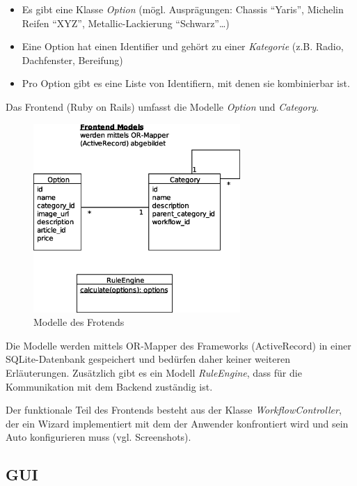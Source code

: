 \documentclass[a4paper,10pt]{article}
\begin{document}
\begin{itemize}
 \item Es gibt eine Klasse \emph{Option} (mögl. Ausprägungen: Chassis "`Yaris"', Michelin Reifen "`XYZ"', Metallic-Lackierung "`Schwarz"'\ldots)
 \item Eine Option hat einen Identifier und gehört zu einer \emph{Kategorie} (z.B. Radio, Dachfenster, Bereifung)
 \item Pro Option gibt es eine Liste von Identifiern, mit denen sie kombinierbar ist.
\end{itemize}

Das Frontend (Ruby on Rails) umfasst die Modelle \textit{Option} und \textit{Category}.

\begin{center}
  \begin{figure}[t]
    \includegraphics[width=0.7\textwidth]{frontend_models.eps}
    \caption{Modelle des Frotends}
    \label{frontend_models}
  \end{figure}
\end{center}

Die Modelle werden mittels OR-Mapper des Frameworks (ActiveRecord) in einer SQLite-Datenbank gespeichert und bedürfen daher keiner weiteren Erläuterungen.
Zusätzlich gibt es ein Modell \textit{RuleEngine}, dass für die Kommunikation mit dem Backend zuständig ist.

Der funktionale Teil des Frontends besteht aus der Klasse \textit{WorkflowController}, der ein Wizard implementiert mit dem der Anwender konfrontiert wird und sein Auto konfigurieren muss (vgl. Screenshots).

\subsection*{GUI}
\end{document}
